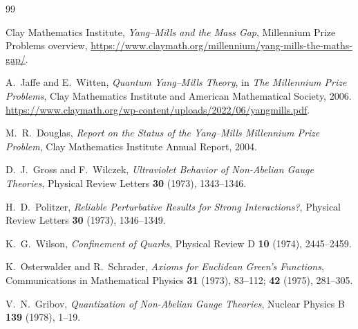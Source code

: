 \documentclass[11pt]{article}
\begin{document}
\begin{thebibliography}{99}

Clay Mathematics Institute,
\emph{Yang--Mills and the Mass Gap}, Millennium Prize Problems overview,
\url{https://www.claymath.org/millennium/yang-mills-the-maths-gap/}.

A.~Jaffe and E.~Witten,
\emph{Quantum Yang--Mills Theory},
in \emph{The Millennium Prize Problems},
Clay Mathematics Institute and American Mathematical Society, 2006.
\url{https://www.claymath.org/wp-content/uploads/2022/06/yangmills.pdf}.

M.~R.~Douglas,
\emph{Report on the Status of the Yang--Mills Millennium Prize Problem},
Clay Mathematics Institute Annual Report, 2004.

D.~J.~Gross and F.~Wilczek,
\emph{Ultraviolet Behavior of Non-Abelian Gauge Theories},
Physical Review Letters \textbf{30} (1973), 1343--1346.

H.~D.~Politzer,
\emph{Reliable Perturbative Results for Strong Interactions?},
Physical Review Letters \textbf{30} (1973), 1346--1349.

K.~G.~Wilson,
\emph{Confinement of Quarks},
Physical Review D \textbf{10} (1974), 2445--2459.

K.~Osterwalder and R.~Schrader,
\emph{Axioms for Euclidean Green's Functions},
Communications in Mathematical Physics \textbf{31} (1973), 83--112;
\textbf{42} (1975), 281--305.

V.~N.~Gribov,
\emph{Quantization of Non-Abelian Gauge Theories},
Nuclear Physics B \textbf{139} (1978), 1--19.

\end{thebibliography}
\end{document}
